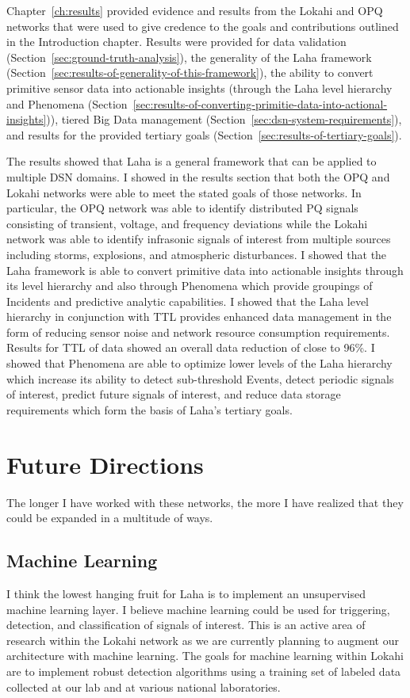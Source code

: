 Chapter~\ref{ch:results} provided evidence and results from the Lokahi and OPQ networks that were used to give credence to the goals and contributions outlined in the Introduction chapter. Results were provided for data validation (Section~\ref{sec:ground-truth-analysis}), the generality of the Laha framework (Section~\ref{sec:results-of-generality-of-this-framework}), the ability to convert primitive sensor data into actionable insights (through the Laha level hierarchy and Phenomena (Section~\ref{sec:results-of-converting-primitie-data-into-actional-insights})), tiered Big Data management (Section~\ref{sec:dsn-system-requirements}), and results for the provided tertiary goals (Section~\ref{sec:results-of-tertiary-goals}).

The results showed that Laha is a general framework that can be applied to multiple DSN domains. I showed in the results section that both the OPQ and Lokahi networks were able to meet the stated goals of those networks. In particular, the OPQ network was able to identify distributed PQ signals consisting of transient, voltage, and frequency deviations while the Lokahi network was able to identify infrasonic signals of interest from multiple sources including storms, explosions, and atmospheric disturbances. I showed that the Laha framework is able to convert primitive data into actionable insights through its level hierarchy and also through Phenomena which provide groupings of Incidents and predictive analytic capabilities. I showed that the Laha level hierarchy in conjunction with TTL provides enhanced data management in the form of reducing sensor noise and network resource consumption requirements. Results for TTL of data showed an overall data reduction of close to 96\%. I showed that Phenomena are able to optimize lower levels of the Laha hierarchy which increase its ability to detect sub-threshold Events, detect periodic signals of interest, predict future signals of interest, and reduce data storage requirements which form the basis of Laha's tertiary goals.

\section{Future Directions}\label{sec:future-directions}

The longer I have worked with these networks, the more I have realized that they could be expanded in a multitude of ways.

\subsection{Machine Learning}\label{subsec:machine-learning}
I think the lowest hanging fruit for Laha is to implement an unsupervised machine learning layer. I believe machine learning could be used for triggering, detection, and classification of signals of interest. This is an active area of research within the Lokahi network as we are currently planning to augment our architecture with machine learning. The goals for machine learning within Lokahi are to implement robust detection algorithms using a training set of labeled data collected at our lab and at various national laboratories.


